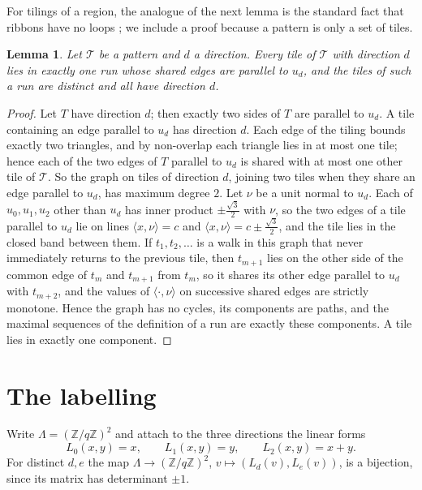 \documentclass[11pt,a4paper]{amsart}
\newtheorem{lemma}[theorem]{Lemma}
\theoremstyle{definition}
\theoremstyle{remark}
\newcommand{\Z}{\mathbb{Z}}
\begin{document}
For tilings of a region, the analogue of the next lemma is the standard fact that ribbons have no loops \cite[Lemma~2.2]{FH}; we include a proof because a pattern is only a set of tiles.

\begin{lemma}\label{lem:runs}
Let $\mathcal T$ be a pattern and $d$ a direction. Every tile of $\mathcal T$ with direction $d$ lies in exactly one run whose shared edges are parallel to $u_d$, and the tiles of such a run are distinct and all have direction $d$.
\end{lemma}

\begin{proof}
Let $T$ have direction $d$; then exactly two sides of $T$ are parallel to $u_d$. A tile containing an edge parallel to $u_d$ has direction $d$. Each edge of the tiling bounds exactly two triangles, and by non-overlap each triangle lies in at most one tile; hence each of the two edges of $T$ parallel to $u_d$ is shared with at most one other tile of $\mathcal T$. So the graph on tiles of direction $d$, joining two tiles when they share an edge parallel to $u_d$, has maximum degree $2$. Let $\nu$ be a unit normal to $u_d$. Each of $u_0,u_1,u_2$ other than $u_d$ has inner product $\pm\tfrac{\sqrt3}{2}$ with $\nu$, so the two edges of a tile parallel to $u_d$ lie on lines $\langle x,\nu\rangle=c$ and $\langle x,\nu\rangle=c\pm\tfrac{\sqrt3}{2}$, and the tile lies in the closed band between them. If $t_1,t_2,\dots$ is a walk in this graph that never immediately returns to the previous tile, then $t_{m+1}$ lies on the other side of the common edge of $t_m$ and $t_{m+1}$ from $t_m$, so it shares its other edge parallel to $u_d$ with $t_{m+2}$, and the values of $\langle\cdot,\nu\rangle$ on successive shared edges are strictly monotone. Hence the graph has no cycles, its components are paths, and the maximal sequences of the definition of a run are exactly these components. A tile lies in exactly one component.
\end{proof}

\section{The labelling}

Write $\Lambda=(\Z/q\Z)^2$ and attach to the three directions the linear forms
\[
L_0(x,y)=x,\qquad L_1(x,y)=y,\qquad L_2(x,y)=x+y .
\]
For distinct $d,e$ the map $\Lambda\to(\Z/q\Z)^2$, $v\mapsto(L_d(v),L_e(v))$, is a bijection, since its matrix has determinant $\pm1$.
\end{document}
